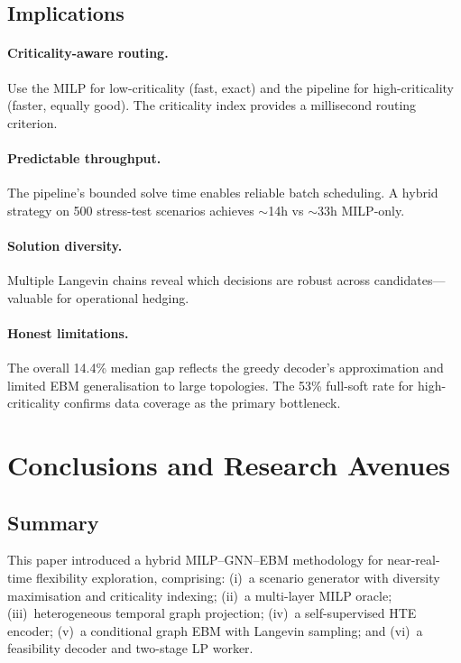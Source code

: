\documentclass{article}
\begin{document}
\subsection{Implications}

\paragraph{Criticality-aware routing.} Use the MILP for low-criticality (fast, exact) and the pipeline for high-criticality (faster, equally good). The criticality index provides a millisecond routing criterion.

\paragraph{Predictable throughput.} The pipeline's bounded solve time enables reliable batch scheduling. A hybrid strategy on 500 stress-test scenarios achieves $\sim$14h vs $\sim$33h MILP-only.

\paragraph{Solution diversity.} Multiple Langevin chains reveal which decisions are robust across candidates---valuable for operational hedging.

\paragraph{Honest limitations.} The overall 14.4\% median gap reflects the greedy decoder's approximation and limited EBM generalisation to large topologies. The 53\% full-soft rate for high-criticality confirms data coverage as the primary bottleneck.


\section{Conclusions and Research Avenues}
\label{sec:conclusion}

\subsection{Summary}

This paper introduced a hybrid MILP--GNN--EBM methodology for near-real-time flexibility exploration, comprising: (i)~a scenario generator with diversity maximisation and criticality indexing; (ii)~a multi-layer MILP oracle; (iii)~heterogeneous temporal graph projection; (iv)~a self-supervised HTE encoder; (v)~a conditional graph EBM with Langevin sampling; and (vi)~a feasibility decoder and two-stage LP worker.
\end{document}
